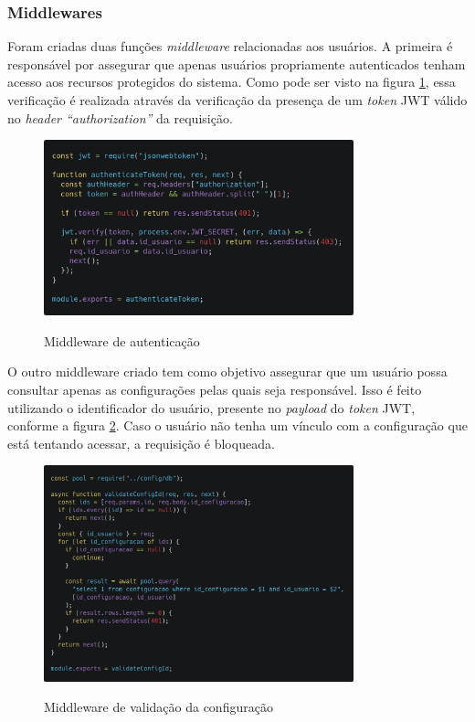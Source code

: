 \subsubsection{Middlewares}
Foram criadas duas funções \textit{middleware} relacionadas aos usuários. A primeira é responsável por assegurar que apenas usuários propriamente autenticados tenham acesso aos recursos protegidos do sistema. Como pode ser visto na figura \ref{fig:auth}, essa verificação é realizada através da verificação da presença de um \textit{token} JWT válido no \textit{header ``authorization''} da requisição.

\begin{figure}[!htb]
	\centering
	\caption{Middleware de autenticação}
	\includegraphics[width=0.8\textwidth]{./dados/figuras/authMiddleware}
	\label{fig:auth}
\end{figure}
\pagebreak

O outro middleware criado tem como objetivo assegurar que um usuário possa consultar apenas as configurações pelas quais seja responsável. Isso é feito utilizando o identificador do usuário, presente no \textit{payload} do \textit{token} JWT, conforme a figura \ref{fig:configMiddleware}. Caso o usuário não tenha um vínculo com a configuração que está tentando acessar, a requisição é bloqueada.

\begin{figure}[!htb]
	\centering
	\caption{Middleware de validação da configuração}
	\includegraphics[width=0.8\textwidth]{./dados/figuras/configMiddleware}
	\label{fig:configMiddleware}
\end{figure}
\pagebreak


